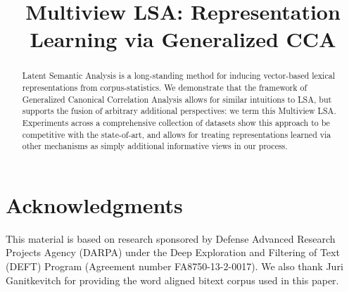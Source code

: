 \documentclass[11pt]{article}
\title{Multiview LSA: Representation Learning via Generalized CCA}
\date{}
\begin{document}
\maketitle
\begin{abstract}
  Latent Semantic Analysis is a long-standing method for inducing
  vector-based lexical representations from corpus-statistics.  We
  demonstrate that the framework of Generalized Canonical Correlation
  Analysis allows for similar intuitions to LSA, but supports the
  fusion of arbitrary additional perspectives: we term this Multiview
  LSA.  Experiments across a comprehensive collection of datasets show
  this approach to be competitive with the state-of-art, and allows
  for treating representations learned via other mechanisms as simply
  additional informative views in our process.
\end{abstract}



















\section*{Acknowledgments}
This material is based on research sponsored by Defense Advanced Research
Projects Agency (DARPA) under the Deep Exploration and
Filtering of Text (DEFT) Program (Agreement number
FA8750-13-2-0017). We also thank Juri Ganitkevitch for 
providing the word aligned bitext corpus used in this paper.



\end{document}
